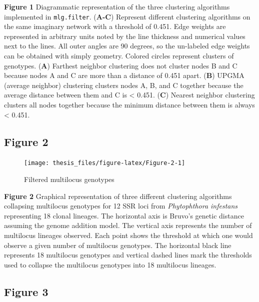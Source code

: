 \documentclass[double,12pt]{beavtex}
\begin{document}
  \textbf{Figure 1} Diagrammatic representation of the three clustering
  algorithms implemented in \texttt{mlg.filter}. (\textbf{A-C}) Represent
  different clustering algorithms on the same imaginary network with a
  threshold of 0.451. Edge weights are represented in arbitrary units
  noted by the line thickness and numerical values next to the lines. All
  outer angles are 90 degrees, so the un-labeled edge weights can be
  obtained with simply geometry. Colored circles represent clusters of
  genotypes. (\textbf{A}) Farthest neighbor clustering does not cluster
  nodes B and C because nodes A and C are more than a distance of 0.451
  apart. (\textbf{B}) UPGMA (average neighbor) clustering clusters nodes
  A, B, and C together because the average distance between them and C is
  \textless{} 0.451. (\textbf{C}) Nearest neighbor clustering clusters all
  nodes together because the minimum distance between them is always
  \textless{} 0.451.
  
  \newpage
  
  \subsection{Figure 2}\label{figure-2}
  
  \begin{figure}
  
  {\centering \texttt{[image: thesis\_files/figure-latex/Figure-2-1]} 
  
  }
  
  \caption[Filtered multilocus genotypes]{Filtered multilocus genotypes}\label{fig:Figure-2}
  \end{figure}
  
  \textbf{Figure 2} Graphical representation of three different clustering
  algorithms collapsing multilocus genotypes for 12 SSR loci from
  \emph{Phytophthora infestans} representing 18 clonal lineages. The
  horizontal axis is Bruvo's genetic distance assuming the genome addition
  model. The vertical axis represents the number of multilocus lineages
  observed. Each point shows the threshold at which one would observe a
  given number of multilocus genotypes. The horizontal black line
  represents 18 multilocus genotypes and vertical dashed lines mark the
  thresholds used to collapse the multilocus genotypes into 18 multilocus
  lineages.
  
  \newpage
  
  \subsection{Figure 3}\label{figure-3}
  
\end{document}
